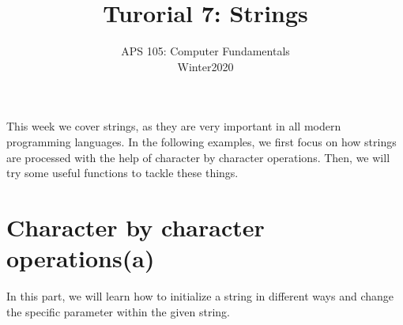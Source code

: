 \documentclass[12pt]{article}
\begin{document}
 
 
\title{Turorial 7: Strings}
\date{}
\author{APS 105: Computer Fundamentals\\ %
Winter2020}

\maketitle
This week we cover strings, as they are very important in all modern programming languages. In the following examples, we first focus on how strings are processed with the help of character by character operations. Then, we will try some useful functions to tackle these things. 
\section{Character by character operations(a)}
In this part, we will learn how to initialize a string in different ways and change the specific parameter within the given string.
\end{document}
